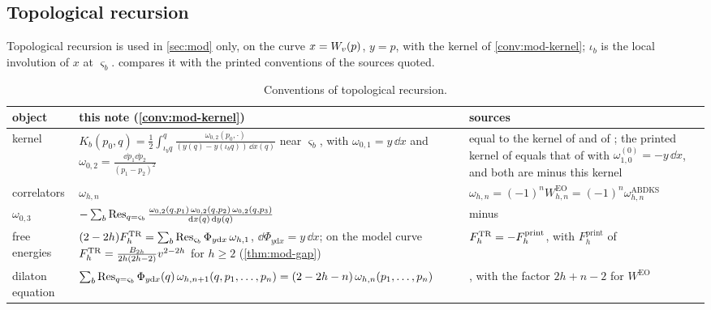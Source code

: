 
\subsection{Topological recursion}
\label{sec:sgn-tr}

Topological recursion is used in \cref{sec:mod} only, on the curve $x=W_{v}(p)$, $y=p$, with the kernel of \cref{conv:mod-kernel}; $\iota_b$ is the local involution of $x$ at $\varsigma_b$.  compares it with the printed conventions of the sources quoted.

\begin{table}[ht]
\caption{Conventions of topological recursion.}
\label{tab:sgn-tr}
\centering
\footnotesize
\renewcommand{\arraystretch}{1.2}
\begin{tabular}{@{}>{\raggedright\arraybackslash}p{}>{\raggedright\arraybackslash}p{}>{\raggedright\arraybackslash}p{}@{}}
\hline
object & this note (\cref{conv:mod-kernel}) & sources \\
\hline
kernel & $K_b(p_0,q)=\frac12\int_{\iota_bq}^{q}\frac{\omega_{0,2}(p_0,\cdot)}{(y(q)-y(\iota_bq))\,\dd x(q)}$ near $\varsigma_b$, with $\omega_{0,1}=y\,\dd x$ and $\omega_{0,2}=\frac{\dd p_1\dd p_2}{(p_1-p_2)^2}$ & equal to the kernel of \cite[(2-26)--(2-29)]{Dunin-Barkowski:2015caa} and of \cite[(2.1)]{Hock25}; the printed kernel of \cite[(4-3), (4-9)]{Eynard:2007kz} equals that of \cite[(1.1)]{ABDKS25} with $\omega^{(0)}_{1,0}=-y\,\dd x$, and both are minus this kernel \\
correlators & $\omega_{h,n}$ & $\omega_{h,n}=(-1)^nW^{\mathrm{EO}}_{h,n}=(-1)^n\omega^{\mathrm{ABDKS}}_{h,n}$ \\
$\omega_{0,3}$ & $-\sum_b\operatorname*{Res}_{q=\varsigma_b}\frac{\omega_{0,2}(q,p_1)\,\omega_{0,2}(q,p_2)\,\omega_{0,2}(q,p_3)}{\mathrm{d} x(q)\,\mathrm{d} y(q)}$ & minus \cite[Theorem~4.1, (4-20)]{Eynard:2007kz} \\
free energies & $(2-2h)F^{\mathrm{TR}}_h=\sum_b\operatorname*{Res}_{\varsigma_b}\Phi_{y\mathrm dx}\,\omega_{h,1}$, $\dd\Phi_{y\mathrm dx}=y\,\dd x$; on the model curve $F^{\mathrm{TR}}_h=\frac{B_{2h}}{2h(2h-2)}v^{2-2h}$ for $h\geq2$ (\cref{thm:mod-gap}) & $F^{\mathrm{TR}}_h=-F^{\mathrm{print}}_h$, with $F^{\mathrm{print}}_h$ of \cite[(4-10)]{Eynard:2007kz} \\
dilaton equation & $\sum_b\operatorname*{Res}_{q=\varsigma_b}\Phi_{y\mathrm dx}(q)\,\omega_{h,n+1}(q,p_1,\dots,p_n)=(2-2h-n)\,\omega_{h,n}(p_1,\dots,p_n)$ & \cite[Theorem~4.7, (4-30)]{Eynard:2007kz}, with the factor $2h+n-2$ for $W^{\mathrm{EO}}$ \\

\end{tabular}
\end{table}
